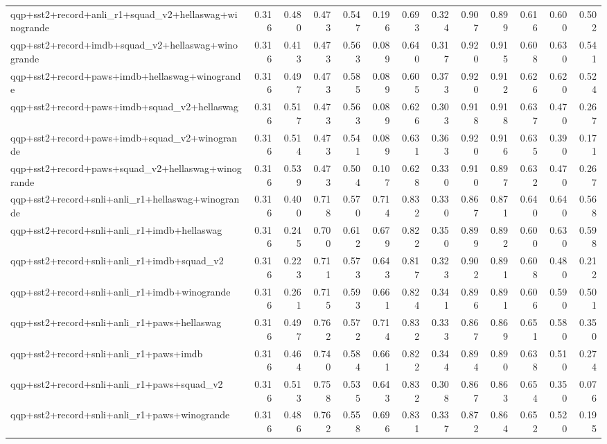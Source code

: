 \begin{table}[t]
\begin{tabular}{lrrrrrrrrrrrr}
    qqp+sst2+record+anli\_r1+squad\_v2+hellaswag+winogrande & 0.316 & 0.480 & 0.473 & 0.547 & 0.196 & 0.693 & 0.324 & 0.907 & 0.899 & 0.616 & 0.600 & 0.502 \\
    qqp+sst2+record+imdb+squad\_v2+hellaswag+winogrande & 0.316 & 0.413 & 0.473 & 0.563 & 0.089 & 0.640 & 0.317 & 0.920 & 0.915 & 0.608 & 0.630 & 0.541 \\
    qqp+sst2+record+paws+imdb+hellaswag+winogrande & 0.316 & 0.497 & 0.473 & 0.585 & 0.089 & 0.605 & 0.373 & 0.920 & 0.912 & 0.626 & 0.620 & 0.524 \\
    qqp+sst2+record+paws+imdb+squad\_v2+hellaswag & 0.316 & 0.517 & 0.473 & 0.563 & 0.089 & 0.626 & 0.303 & 0.918 & 0.918 & 0.637 & 0.470 & 0.267 \\
    qqp+sst2+record+paws+imdb+squad\_v2+winogrande & 0.316 & 0.514 & 0.473 & 0.541 & 0.089 & 0.631 & 0.363 & 0.920 & 0.916 & 0.635 & 0.390 & 0.171 \\
    qqp+sst2+record+paws+squad\_v2+hellaswag+winogrande & 0.316 & 0.539 & 0.473 & 0.504 & 0.107 & 0.628 & 0.330 & 0.910 & 0.897 & 0.632 & 0.470 & 0.267 \\
    qqp+sst2+record+snli+anli\_r1+hellaswag+winogrande & 0.316 & 0.400 & 0.718 & 0.570 & 0.714 & 0.832 & 0.330 & 0.867 & 0.871 & 0.640 & 0.640 & 0.568 \\
    qqp+sst2+record+snli+anli\_r1+imdb+hellaswag & 0.316 & 0.245 & 0.700 & 0.612 & 0.679 & 0.822 & 0.350 & 0.899 & 0.892 & 0.600 & 0.630 & 0.598 \\
    qqp+sst2+record+snli+anli\_r1+imdb+squad\_v2 & 0.316 & 0.223 & 0.711 & 0.573 & 0.643 & 0.817 & 0.323 & 0.902 & 0.891 & 0.608 & 0.480 & 0.212 \\
    qqp+sst2+record+snli+anli\_r1+imdb+winogrande & 0.316 & 0.261 & 0.715 & 0.593 & 0.661 & 0.824 & 0.341 & 0.896 & 0.891 & 0.606 & 0.590 & 0.501 \\
    qqp+sst2+record+snli+anli\_r1+paws+hellaswag & 0.316 & 0.497 & 0.762 & 0.572 & 0.714 & 0.832 & 0.333 & 0.867 & 0.869 & 0.651 & 0.580 & 0.350 \\
    qqp+sst2+record+snli+anli\_r1+paws+imdb & 0.316 & 0.464 & 0.740 & 0.584 & 0.661 & 0.822 & 0.344 & 0.894 & 0.890 & 0.638 & 0.510 & 0.274 \\
    qqp+sst2+record+snli+anli\_r1+paws+squad\_v2 & 0.316 & 0.513 & 0.758 & 0.535 & 0.643 & 0.832 & 0.308 & 0.867 & 0.863 & 0.654 & 0.350 & 0.076 \\
    qqp+sst2+record+snli+anli\_r1+paws+winogrande & 0.316 & 0.486 & 0.762 & 0.558 & 0.696 & 0.831 & 0.337 & 0.872 & 0.864 & 0.652 & 0.520 & 0.195 \\

\end{tabular}
\end{table}

